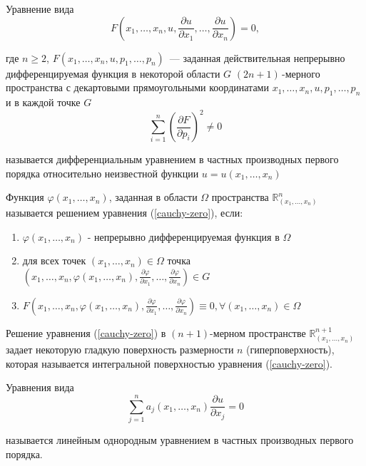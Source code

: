 \setcounter{equation}{0}
\par \Def Уравнение вида
\begin{equation}\label{cauchy-zero}
    F(x_1, \ldots, x_n, u, \frac{\partial u}{\partial x_1}, \ldots, \frac{\partial u}{\partial x_n}) = 0,
\end{equation}
\par где $n \geq 2$, $F(x_1, \ldots, x_n, u, p_1, \ldots, p_n)$~--- заданная действительная непрерывно дифференцируемая функция в некоторой области $G$ $(2n + 1)$\,-мерного
пространства с декартовыми прямоугольными координатами $x_1, \ldots, x_n, u, p_1, \ldots, p_n$ и в каждой точке $G$
$$\sum_{i=1}^n \left(\frac{\partial F}{\partial p_i}\right)^2 \neq 0$$
\par называется дифференциальным уравнением в частных
производных первого порядка относительно неизвестной функции $u = u(x_1, \ldots, x_n)$

\par \Def Функция $\varphi(x_1, \ldots, x_n)$, заданная в области $\Omega$ пространства $\mathbb{R}_{(x_1, \ldots, x_n)}^n$ называется решением уравнения (\ref{cauchy-zero}), если:
\begin{enumerate}
    \item $\varphi(x_1, \ldots, x_n)$ - непрерывно дифференцируемая функция в $\Omega$
    \item для всех точек $(x_1, \ldots, x_n)\in \Omega$ точка $(x_1, \ldots, x_n, \varphi(x_1, \ldots, x_n), \frac{\partial \varphi}{\partial x_1}, \ldots, \frac{\partial \varphi}{\partial x_n}) \in G$
    \item $F(x_1, \ldots, x_n, \varphi(x_1, \ldots, x_n), \frac{\partial \varphi}{\partial x_1}, \ldots, \frac{\partial \varphi}{\partial x_n}) \equiv 0, \forall (x_1, \ldots, x_n)\in \Omega$
\end{enumerate}

\par \Def Решение уравнения (\ref{cauchy-zero}) в $(n+1)$-мерном пространстве $\mathbb{R}_{(x_1, \ldots, x_n)}^{n+1}$ задает некоторую гладкую поверхность размерности $n$ (гиперповерхность), которая называется интегральной поверхностью уравнения (\ref{cauchy-zero}).

\par \Def Уравнения вида $$\sum_{j=1}^n a_j(x_1, \ldots, x_n) \frac{\partial u}{\partial x_j} = 0$$
\par называется линейным однородным уравнением в частных производных первого порядка.

